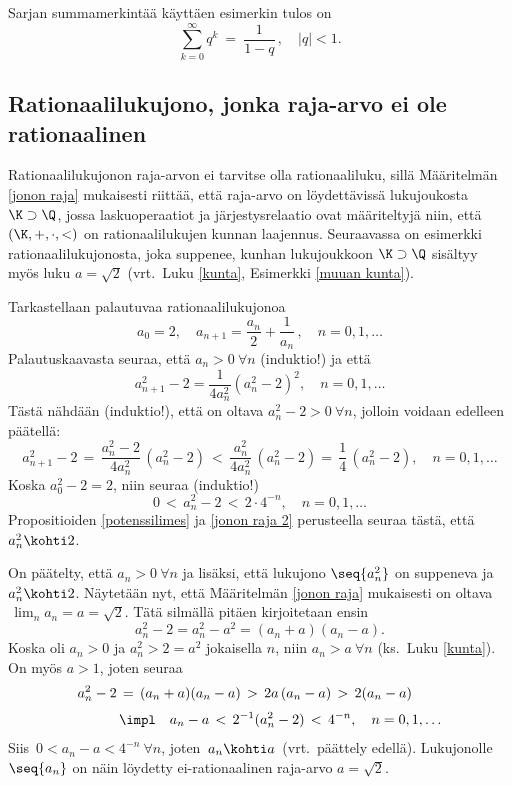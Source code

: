Sarjan summamerkintää käyttäen esimerkin tulos on
\[
\boxed{\quad \sum_{k=0}^{\infty} q^k\ =\ \frac{1}{1-q}\,, \quad |q|<1. \quad}
\]

\subsection{Rationaalilukujono, jonka raja-arvo ei ole rationaalinen}

Rationaalilukujonon raja-arvon ei tarvitse olla rationaaliluku, sillä Määritelmän
\ref{jonon raja} mukaisesti riittää, että raja-arvo on löydettävissä lukujoukosta
$\K\supset\Q$, jossa laskuoperaatiot ja järjestysrelaatio ovat määriteltyjä niin,
että $(\K,+,\cdot,<)$ on rationaalilukujen kunnan laajennus. Seuraavassa on esimerkki 
rationaalilukujonosta, joka suppenee, kunhan lukujoukkoon $\K\supset\Q$ sisältyy 
myös luku $a=\sqrt{2}$ (vrt.\ Luku \ref{kunta}, Esimerkki \ref{muuan kunta}).
\begin{Exa} \label{sqrt 2} Tarkastellaan palautuvaa rationaalilukujonoa
\[
a_0 = 2, \quad a_{n+1} = \frac{a_n}{2} + \frac{1}{a_n}\,, \quad n = 0,1,\ldots
\]
Palautuskaavasta seuraa, että $a_n>0\ \forall n$ (induktio!) ja että
\[
a_{n+1}^2 -2 = \frac{1}{4 a_n^2}\left(a_n^2 - 2\right)^2, \quad n = 0,1,\ldots
\]
Tästä nähdään (induktio!), että on oltava $a_n^2-2>0\ \forall n$, jolloin voidaan edelleen 
päätellä:
\[
a_{n+1}^2-2\,=\,\frac{a_n^2-2}{4 a_n^2}\,(a_n^2-2)\,
             <\,\frac{a_n^2}{4a_n^2}\,(a_n^2-2)
             =\,\frac{1}{4}\,(a_n^2-2), \quad n=0,1, \ldots
\]
Koska $a_0^2-2 = 2$, niin seuraa (induktio!)
\[
0\,<\,a_n^2-2\,<\,2\cdot 4^{-n}, \quad n=0,1, \ldots
\]
Propositioiden \ref{potenssilimes} ja \ref{jonon raja 2} perusteella seuraa tästä, että
$a_n^2 \kohti 2$.

On päätelty, että $a_n>0\ \forall n$ ja lisäksi, että lukujono $\seq{a_n^2}$ on suppeneva ja
$a_n^2 \kohti 2$. Näytetään nyt, että Määritelmän \ref{jonon raja} mukaisesti on oltava 
$\,\lim_n a_n=a=\sqrt{2}$. Tätä silmällä pitäen kirjoitetaan ensin
\[
a_n^2 - 2 = a_n^2 - a^2 = (a_n + a)(a_n - a).
\]
Koska oli $a_n>0$ ja $a_n^2>2=a^2$ jokaisella $n$, niin $a_n>a\ \forall n$ 
(ks.\ Luku \ref{kunta}). On myös $a>1$, joten seuraa
\begin{align*}
a_n^2-2\,&=\,(a_n+a)(a_n-a)\,>\,2a\,(a_n-a)\,>\,2(a_n-a) \\[1mm]
         &\impl\quad a_n-a\,<\,2^{-1}(a_n^2-2)\,<\,4^{-n}, \quad n=0,1, \ldots
\end{align*}
Siis $\,0<a_n-a<4^{-n}\ \forall n$, joten $\,a_n \kohti a\,$ (vrt.\ päättely edellä).
Lukujonolle $\seq{a_n}$ on näin löydetty ei-rationaalinen raja-arvo $a=\sqrt{2}$. \loppu
\end{Exa}

